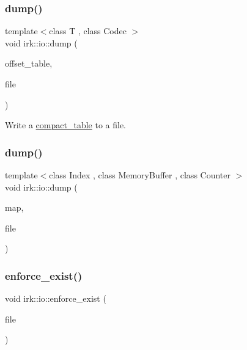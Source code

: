 \subsubsection{\texorpdfstring{dump()}{dump()}\hspace{0.1cm}{\footnotesize\ttfamily [1/2]}}
{\footnotesize\ttfamily template$<$class T , class Codec $>$ \\
void irk\+::io\+::dump (\begin{DoxyParamCaption}\item[{const \mbox{\hyperlink{classirk_1_1compact__table}{compact\+\_\+table}}$<$ T, Codec $>$ \&}]{offset\+\_\+table,  }\item[{fs\+::path}]{file }\end{DoxyParamCaption})}



Write a {\ttfamily \mbox{\hyperlink{classirk_1_1compact__table}{compact\+\_\+table}}} to a file. 

\mbox{\label{namespaceirk_1_1io_a4b74cc5a440f69992ce2302aebfc0b4d}} 
\subsubsection{\texorpdfstring{dump()}{dump()}\hspace{0.1cm}{\footnotesize\ttfamily [2/2]}}
{\footnotesize\ttfamily template$<$class Index , class Memory\+Buffer , class Counter $>$ \\
void irk\+::io\+::dump (\begin{DoxyParamCaption}\item[{const \mbox{\hyperlink{classirk_1_1prefix__map}{prefix\+\_\+map}}$<$ Index, Memory\+Buffer, Counter $>$ \&}]{map,  }\item[{fs\+::path}]{file }\end{DoxyParamCaption})}

\mbox{\label{namespaceirk_1_1io_aa9967d537be4185e88420785431fb63b}} 
\subsubsection{\texorpdfstring{enforce\+\_\+exist()}{enforce\_exist()}}
{\footnotesize\ttfamily void irk\+::io\+::enforce\+\_\+exist (\begin{DoxyParamCaption}\item[{const fs\+::path \&}]{file }\end{DoxyParamCaption})}

